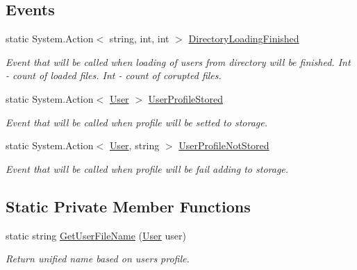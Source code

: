 \subsection*{Events}
\begin{DoxyCompactItemize}
\item 
static System.\+Action$<$ string, int, int $>$ \mbox{\hyperlink{class_authority_controller_1_1_a_p_i_1_1_local_users_a54370dd6dd474a14106891cd6d0beaaf}{Directory\+Loading\+Finished}}
\begin{DoxyCompactList}\small\item\em Event that will be called when loading of users from directory will be finished. Int -\/ count of loaded files. Int -\/ count of corupted files. \end{DoxyCompactList}\item 
static System.\+Action$<$ \mbox{\hyperlink{class_authority_controller_1_1_data_1_1_personal_1_1_user}{User}} $>$ \mbox{\hyperlink{class_authority_controller_1_1_a_p_i_1_1_local_users_af973c97a05818a9e360aadca02da8834}{User\+Profile\+Stored}}
\begin{DoxyCompactList}\small\item\em Event that will be called when profile will be setted to storage. \end{DoxyCompactList}\item 
static System.\+Action$<$ \mbox{\hyperlink{class_authority_controller_1_1_data_1_1_personal_1_1_user}{User}}, string $>$ \mbox{\hyperlink{class_authority_controller_1_1_a_p_i_1_1_local_users_af05c837a76c7b94631884b965e5cc75d}{User\+Profile\+Not\+Stored}}
\begin{DoxyCompactList}\small\item\em Event that will be called when profile will be fail adding to storage. \end{DoxyCompactList}\end{DoxyCompactItemize}
\subsection*{Static Private Member Functions}
\begin{DoxyCompactItemize}
\item 
static string \mbox{\hyperlink{class_authority_controller_1_1_a_p_i_1_1_local_users_a67fe99b2249aacec99b18538ee86bec8}{Get\+User\+File\+Name}} (\mbox{\hyperlink{class_authority_controller_1_1_data_1_1_personal_1_1_user}{User}} user)
\begin{DoxyCompactList}\small\item\em Return unified name based on user\textquotesingle{}s profile. \end{DoxyCompactList}\end{DoxyCompactItemize}
